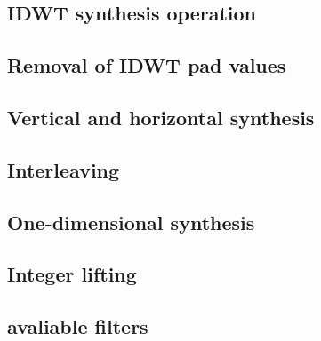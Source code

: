 
\label{idwt}


\subsection{IDWT synthesis operation}
\subsection{Removal of IDWT pad values}
\subsection{Vertical and horizontal synthesis}
\subsection{Interleaving}
\subsection{One-dimensional synthesis}
\subsection{Integer lifting}
\subsection{avaliable filters}
